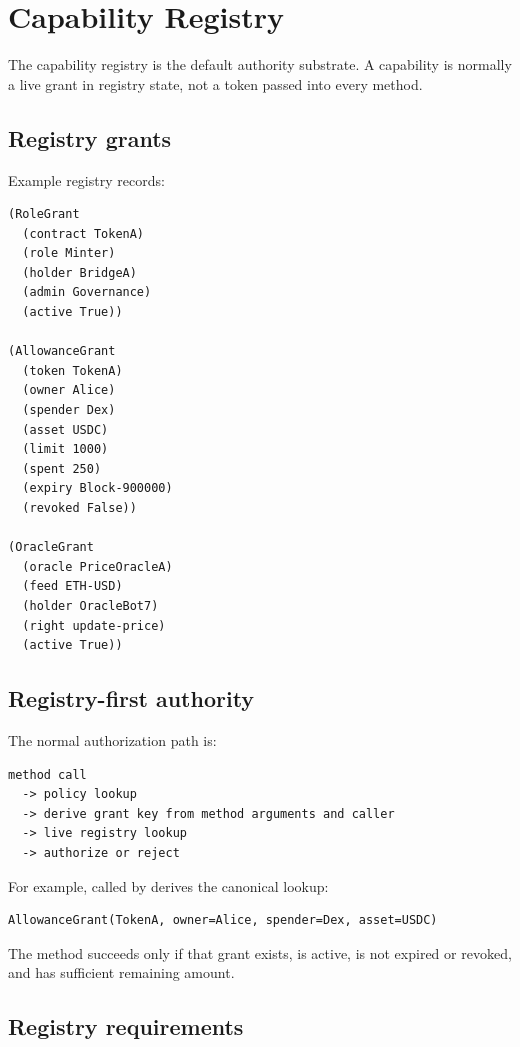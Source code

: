 \section{Capability Registry}

The capability registry is the default authority substrate. A capability is normally a live grant in registry state, not a token passed into every method.

\subsection{Registry grants}

Example registry records:

\begin{lstlisting}
(RoleGrant
  (contract TokenA)
  (role Minter)
  (holder BridgeA)
  (admin Governance)
  (active True))

(AllowanceGrant
  (token TokenA)
  (owner Alice)
  (spender Dex)
  (asset USDC)
  (limit 1000)
  (spent 250)
  (expiry Block-900000)
  (revoked False))

(OracleGrant
  (oracle PriceOracleA)
  (feed ETH-USD)
  (holder OracleBot7)
  (right update-price)
  (active True))
\end{lstlisting}

\subsection{Registry-first authority}

The normal authorization path is:

\begin{lstlisting}
method call
  -> policy lookup
  -> derive grant key from method arguments and caller
  -> live registry lookup
  -> authorize or reject
\end{lstlisting}

For example,  called by  derives the canonical lookup:

\begin{lstlisting}
AllowanceGrant(TokenA, owner=Alice, spender=Dex, asset=USDC)
\end{lstlisting}

The method succeeds only if that grant exists, is active, is not expired or revoked, and has sufficient remaining amount.

\subsection{Registry requirements}


